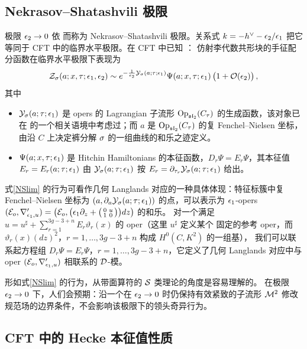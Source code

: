 \subsection{Nekrasov--Shatashvili 极限}

极限 $\epsilon_2\to 0$ 依 \cite{NS} 而称为 Nekrasov--Shatashvili 极限。关系式
$k=-h^{\vee}-\epsilon_2/\epsilon_1$ 把它等同于 CFT 中的临界水平极限。在 CFT 中已知 \cite{T10,FGT}：
仿射李代数共形块的手征配分函数在临界水平极限下表现为
\begin{equation}\label{NSlim}
\mathcal{Z}_\sigma(a;x,\tau;\epsilon_1,\epsilon_2)\sim
e^{-\frac{1}{\epsilon_2}\mathcal{Y}_\sigma(a;\tau;\epsilon_1)}
\Psi(a;x,\tau;\epsilon_1)\,\big(1+\mathcal{O}(\epsilon_2)\big)\,,
\end{equation}
其中
\begin{itemize}
\item $\mathcal{Y}_\sigma(a;\tau;\epsilon_1)$
是 opers 的 Lagrangian 子流形 ${\rm Op}_{\mathfrak{sl}_2}(C_\tau)$ 的生成函数，该对象已在 \cite{NRS}
的一个相关语境中考虑过；而 $a$ 是 ${\rm Op}_{\mathfrak{sl}_2}(C_\tau)$ 的复 Fenchel--Nielsen
坐标，由沿 $C$ 上决定裤分解 $\sigma$ 的一组曲线的和乐之迹定义。
\item $\Psi(a;x,\tau;\epsilon_1)$ 是 Hitchin Hamiltonians 的本征函数，$D_r\Psi=E_r\Psi$，其本征值
$E_r=E_r(a;\tau;\epsilon_1)$ 由 $\mathcal{Y}_\sigma(a;\tau;\epsilon_1)$ 按
$E_r=\partial_{\tau_r}\mathcal{Y}_\sigma(a;\tau;\epsilon_1)$ 给出。
\end{itemize}
式\eqref{NSlim} 的行为可看作几何 Langlands 对应的一种具体体现：特征标簇中复
Fenchel--Nielsen 坐标为 $(a,\partial_a\mathcal{Y}_\sigma(a;\tau;\epsilon_1))$ 的点，可以表示为
$\epsilon_1$-opers $(\mathcal{E}_{o},\nabla'_{\epsilon_1,u})=
 \big(\mathcal{E}_{o},\big(\epsilon_1\partial_z+ \big(
 \begin{smallmatrix} 0 & u \\ 1 & 0\end{smallmatrix}\big)\big)dz\big)$ 的和乐。
对一个满足 $u=u^{\sharp}+\sum_{r=1}^{3g-3+n}E_r\vartheta_r(x)$ 的 oper（这里 $u^\sharp$ 定义某个
固定的参考 oper，而 $\vartheta_r(x)(dz)^2$，$r=1,\dots,3g-3+n$ 构成 $H^0(C,K^2)$ 的一组基），
我们可以联系起方程组 $D_r\Psi=E_r\Psi$，$r=1,\dots,3g-3+n$，它定义了几何 Langlands
对应中与 oper $(\mathcal{E}_{o},\nabla'_{\epsilon_1,u})$ 相联系的 $\mathcal{D}$-模。

形如式\eqref{NSlim} 的行为，从带面算符的 $\mathcal{S}$ 类理论的角度是容易理解的。
在极限 $\epsilon_2\to 0$ 下，人们会预期：沿一个在 $\epsilon_2\to 0$ 时仍保持有效紧致的子流形
$\mathcal{M}^2$ 修改规范场的边界条件，不会影响该极限下的领头奇异行为。

\subsection{CFT 中的 Hecke 本征值性质}\label{Hecke-CFT}


